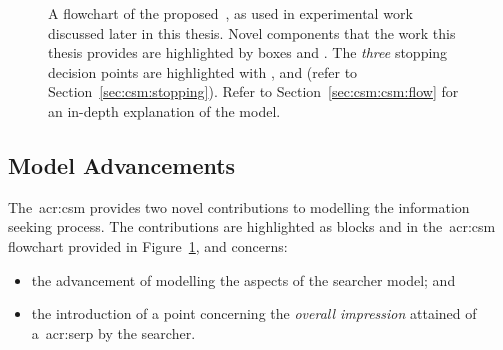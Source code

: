 \begin{figure}[t!]
    \centering
    \caption[Flowchart of the~]{A flowchart of the proposed~, as used in experimental work discussed later in this thesis. Novel components that the work this thesis provides are highlighted by boxes  and . The \emph{three} stopping decision points are highlighted with ,  and  (refer to Section~\ref{sec:csm:stopping}). Refer to Section~\ref{sec:csm:csm:flow} for an in-depth explanation of the model.}
    \label{fig:csm}
\end{figure}

\subsection{Model Advancements}\label{sec:csm:csm:advancements}
The~\gls{acr:csm} provides two novel contributions to modelling the information seeking process. The contributions are highlighted as blocks  and  in the~\gls{acr:csm} flowchart provided in Figure~\ref{fig:csm}, and concerns:

\begin{itemize}
    \item[\blueboxbold{A}]{the advancement of modelling the  aspects of the searcher model; and}
    \item[\blueboxbold{B}]{the introduction of a  point concerning the \emph{overall impression} attained of a~\gls{acr:serp} by the searcher.}
\end{itemize}

